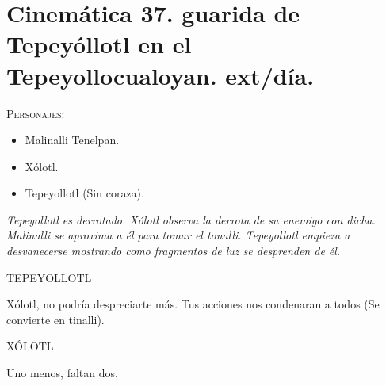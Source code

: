 \documentclass[11pt,letterpaper]{article}
\begin{document}
\section{Cinemática 37. guarida de Tepeyóllotl en el Tepeyollocualoyan. ext/día. }
 \textsc{Personajes}:
 \begin{itemize}
 \item Malinalli Tenelpan.
 \item Xólotl.
 \item Tepeyollotl (Sin coraza).
 \end{itemize}
\textit{Tepeyollotl es derrotado. Xólotl observa la derrota de su enemigo con dicha. Malinalli se aproxima a él para tomar el tonalli. Tepeyollotl empieza a desvanecerse mostrando como fragmentos de luz se desprenden de él.}
\begin{center}
TEPEYOLLOTL
\\
\par
Xólotl, no podría despreciarte más. Tus acciones nos condenaran a todos (Se convierte en tinalli).
\\
\par
XÓLOTL
\\
\par
Uno menos, faltan dos. 
\end{center}
 
\end{document}

